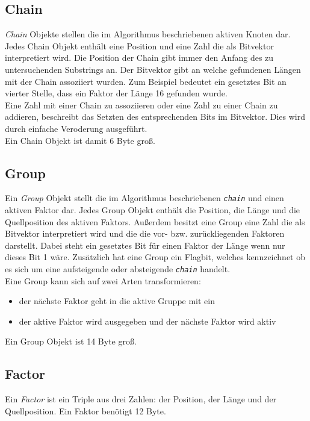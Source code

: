 \subsection{Chain}

\textit{Chain} Objekte stellen die im Algorithmus beschriebenen aktiven Knoten dar.
Jedes Chain Objekt enthält eine Position und eine Zahl die als Bitvektor interpretiert wird. Die Position der Chain gibt immer den Anfang des zu untersuchenden Substrings an. Der Bitvektor  gibt an welche gefundenen Längen mit der Chain assoziiert wurden. Zum Beispiel bedeutet ein gesetztes Bit an vierter Stelle, dass ein Faktor der Länge 16 gefunden wurde. \\
Eine Zahl mit einer Chain zu assoziieren oder eine Zahl zu einer Chain zu addieren, beschreibt das Setzten des entsprechenden Bits im Bitvektor. Dies wird durch einfache Veroderung ausgeführt.\\
Ein Chain Objekt ist damit 6 Byte groß.


\subsection{Group}

Ein \textit{Group} Objekt stellt die im Algorithmus beschriebenen \textit{\texttt{chain}} und einen aktiven Faktor dar.
Jedes Group Objekt enthält die Position, die Länge und die Quellposition des aktiven Faktors.
Außerdem besitzt eine Group eine Zahl die als Bitvektor interpretiert wird und  die die vor- bzw. zurückliegenden Faktoren darstellt. Dabei steht ein gesetztes Bit für einen Faktor der Länge wenn nur dieses Bit 1 wäre. Zusätzlich hat eine Group ein Flagbit, welches kennzeichnet ob es sich um eine aufsteigende oder absteigende \texttt{\textit{chain}} handelt.\\
Eine Group kann sich auf zwei Arten transformieren:
\begin{itemize}
	\item der nächste Faktor geht in die aktive Gruppe mit ein
	\item der aktive Faktor wird ausgegeben und der nächste Faktor wird aktiv
\end{itemize}
Ein Group Objekt ist 14 Byte groß.


\subsection{Factor}

Ein \textit{Factor} ist ein Triple aus drei Zahlen: der Position, der Länge und der Quellposition. 
Ein Faktor benötigt 12 Byte.

